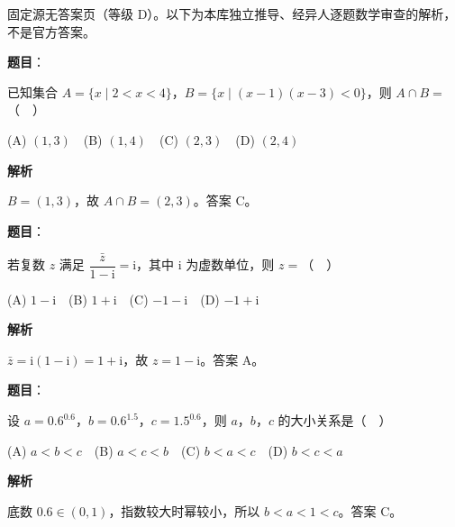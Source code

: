 
\begin{gktip}
固定源无答案页（等级 D）。以下为本库独立推导、经异人逐题数学审查的解析，不是官方答案。
\end{gktip}

\begin{answer}

\textbf{题目}：

已知集合 \(A=\{x\mid2<x<4\}\)，\(B=\{x\mid(x-1)(x-3)<0\}\)，则 \(A\cap B=\)（　）

(A) \((1,3)\)　(B) \((1,4)\)　(C) \((2,3)\)　(D) \((2,4)\)

\textbf{解析}

\(B=(1,3)\)，故 \(A\cap B=(2,3)\)。答案 C。


\end{answer}
\begin{answer}

\textbf{题目}：

若复数 \(z\) 满足 \(\dfrac{\bar z}{1-\mathrm{i}}=\mathrm{i}\)，其中 \(\mathrm{i}\) 为虚数单位，则 \(z=\)（　）

(A) \(1-\mathrm{i}\)　(B) \(1+\mathrm{i}\)　(C) \(-1-\mathrm{i}\)　(D) \(-1+\mathrm{i}\)

\textbf{解析}

\(\bar z=\mathrm{i}(1-\mathrm{i})=1+\mathrm{i}\)，故 \(z=1-\mathrm{i}\)。答案 A。


\end{answer}
\begin{answer}

\textbf{题目}：

设 \(a=0.6^{0.6}\)，\(b=0.6^{1.5}\)，\(c=1.5^{0.6}\)，则 \(a\)，\(b\)，\(c\) 的大小关系是（　）

(A) \(a<b<c\)　(B) \(a<c<b\)　(C) \(b<a<c\)　(D) \(b<c<a\)

\textbf{解析}

底数 \(0.6\in(0,1)\)，指数较大时幂较小，所以 \(b<a<1<c\)。答案 C。


\end{answer}
